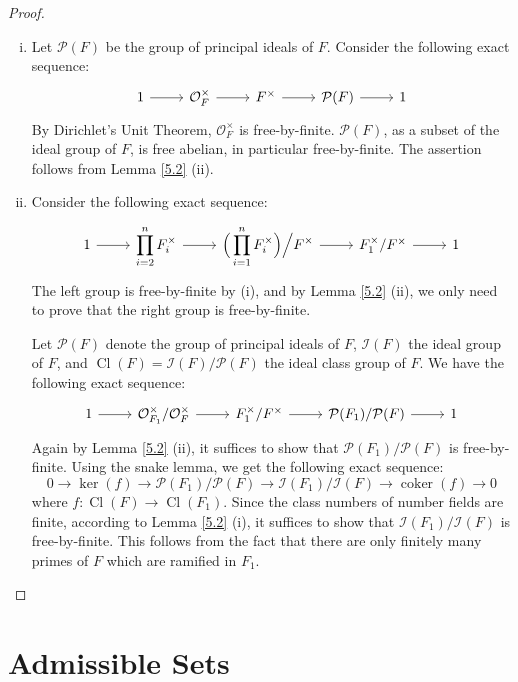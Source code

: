 \begin{proof}
\begin{enumerate}[(i)]
\item Let $\mathcal{P}(F)$ be the group of principal ideals of $F$. Consider the following exact sequence:
\[ \begin{tikzcd}
1 \ar[r] & \mathcal{O}_F^\times \ar[r] & F^\times \ar[r]& \mathcal{P}(F) \ar[r] & 1
\end{tikzcd} \]
By Dirichlet's Unit Theorem, $\mathcal{O}_F^\times$ is free-by-finite. $\mathcal{P}(F)$, as a subset of the ideal group of $F$, is free abelian, in particular free-by-finite. The assertion follows from Lemma \ref{5.2} (ii).
\item Consider the following exact sequence:
\[ \begin{tikzcd}
1 \ar[r] & \displaystyle \prod_{i=2}^{n} F_i^\times \ar[r]& \displaystyle \Big(\prod_{i=1}^{n}F_i^\times\Big)\Big/F^\times \ar[r]& F_1^\times/F^\times \ar[r]& 1
\end{tikzcd} \]
The left group is free-by-finite by (i), and by Lemma \ref{5.2} (ii), we only need to prove that the right group is free-by-finite.

Let $\mathcal{P}(F)$ denote the group of principal ideals of $F$, $\mathcal{I}(F)$ the ideal group of $F$, and $\operatorname{Cl}(F) = \mathcal{I}(F)/\mathcal{P}(F)$ the ideal class group of $F$. We have the following exact sequence:
\[ \begin{tikzcd}
1 \ar[r]& \mathcal{O}_{F_1}^\times /\mathcal{O}_F^\times\ar[r] & F_1^\times / F^\times\ar[r] & \mathcal{P}(F_1)/\mathcal{P}(F)\ar[r] & 1
\end{tikzcd} \]
Again by Lemma \ref{5.2} (ii), it suffices to show that $\mathcal{P}(F_1)/\mathcal{P}(F)$ is free-by-finite. Using the snake lemma, we get the following exact sequence:
\[
0 \longrightarrow \ker(f)\longrightarrow \mathcal{P}(F_1)/\mathcal{P}(F)\longrightarrow \mathcal{I}(F_1)/\mathcal{I}(F)
\longrightarrow \operatorname{coker}(f)\longrightarrow 0 \]
where $f:\operatorname{Cl}(F)\to \operatorname{Cl}(F_1)$. Since the class numbers of number fields are finite, according to Lemma \ref{5.2} (i), it suffices to show that $\mathcal{I}(F_1)/\mathcal{I}(F)$ is free-by-finite. This follows from the fact that there are only finitely many primes of $F$ which are ramified in $F_1$.\qedhere
\end{enumerate}
\end{proof}

\section{Admissible Sets}

